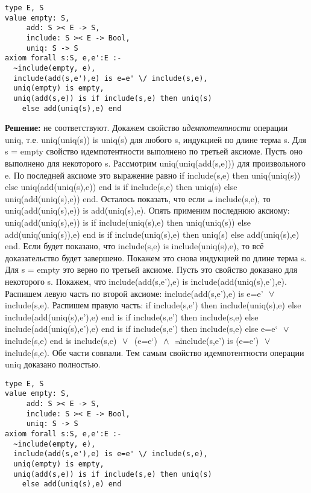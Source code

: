 \z \begin{lstlisting}
type E, S
value empty: S,
     add: S >< E -> S,
     include: S >< E -> Bool,
     uniq: S -> S
axiom forall s:S, e,e':E :-
  ~include(empty, e),
  include(add(s,e'),e) is e=e' \/ include(s,e),
  uniq(empty) is empty,
  uniq(add(s,e)) is if include(s,e) then uniq(s)
    else add(uniq(s),e) end
\end{lstlisting}

\MediumPicture{}

\textbf{Решение:} не соответствуют. Докажем свойство \emph{идемпотентности} операции uniq, т.е. uniq(uniq(s)) is uniq(s) для любого s, индукцией по длине терма s. Для s = empty свойство идемпотентности выполнено по третьей аксиоме. Пусть оно выполнено для некоторого s. Рассмотрим uniq(uniq(add(s,e))) для произвольного e. По последней аксиоме это выражение равно if include(s,e) then uniq(uniq(s)) else uniq(add(uniq(s),e)) end is if include(s,e) then uniq(s) else uniq(add(uniq(s),e)) end. Осталось показать, что если $\Not$ include(s,e), то uniq(add(uniq(s),e)) is add(uniq(s),e). Опять применим последнюю аксиому: uniq(add(uniq(s),e)) is if include(uniq(s),e) then uniq(uniq(s)) else add(uniq(uniq(s)),e) end is if include(uniq(s),e) then uniq(s) else add(uniq(s),e) end. Если будет показано, что include(s,e) is include(uniq(s),e), то всё доказательство будет завершено. Покажем это снова индукцией по длине терма s. Для s = empty это верно по третьей аксиоме. Пусть это свойство доказано для некоторого s. Покажем, что include(add(s,e'),e) is include(add(uniq(s),e'),e). Распишем левую часть по второй аксиоме: include(add(s,e'),e) is e=e' $~\vee~$ include(s,e). Распишем правую часть: if include(s,e') then include(uniq(s),e) else include(add(uniq(s),e'),e) end is if include(s,e') then include(s,e) else include(add(uniq(s),e'),e) end is if include(s,e') then include(s,e) else e=e` $~\vee~$ include(s,e) end is include(s,e) $~\vee~$ (e=e`) $~\wedge~$ $\Not$include(s,e') is (e=e') $~\vee~$ include(s,e). Обе части совпали. Тем самым свойство идемпотентности операции uniq доказано полностью.

\z \begin{lstlisting}
type E, S
value empty: S,
     add: S >< E -> S,
     include: S >< E -> Bool,
     uniq: S -> S
axiom forall s:S, e,e':E :-
  ~include(empty, e),
  include(add(s,e'),e) is e=e' \/ include(s,e),
  uniq(empty) is empty,
  uniq(add(s,e)) is if include(s,e) then uniq(s)
    else add(uniq(s),e) end
\end{lstlisting}

